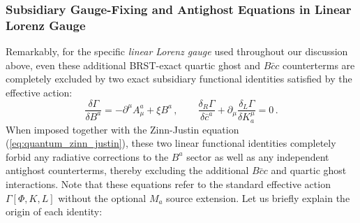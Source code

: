 \subsubsection{Subsidiary Gauge-Fixing and Antighost Equations in Linear Lorenz Gauge}

Remarkably, for the specific \textit{linear Lorenz gauge} used throughout our discussion above, even these additional BRST-exact quartic ghost and \(B\bar{c}c\) counterterms are completely excluded by two exact subsidiary functional identities satisfied by the effective action:
\begin{equation} \label{eq:subsidiary_lorenz_identities}
    \frac{\delta \Gamma}{\delta B^a} = -\partial^\mu A_\mu^a + \xi B^a \, , \qquad \frac{\delta_R \Gamma}{\delta \bar{c}^a} + \partial_\mu \frac{\delta_L \Gamma}{\delta K_a^\mu} = 0 \, .
\end{equation}
When imposed together with the Zinn-Justin equation (\ref{eq:quantum_zinn_justin}), these two linear functional identities completely forbid any radiative corrections to the \(B^a\) sector as well as any independent antighost counterterms, thereby excluding the additional \(B\bar{c}c\) and quartic ghost interactions. Note that these equations refer to the standard effective action \(\Gamma[\Phi, K, L]\) without the optional \(M_a\) source extension. Let us briefly explain the origin of each identity:
